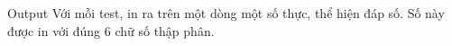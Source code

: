 Output  
Với mỗi test, in ra trên một dòng một số thực, thể hiện đáp số. Số này được in với đúng 6 chữ số thập phân.